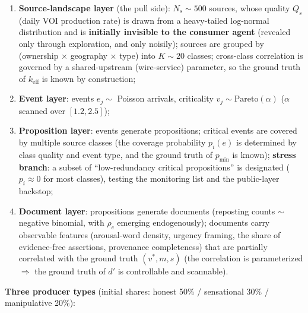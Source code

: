 \documentclass[
  11pt]{article}
\providecommand{\tightlist}{%
  \setlength{\itemsep}{0pt}\setlength{\parskip}{0pt}}
\begin{document}
\begin{enumerate}
\def\labelenumi{\arabic{enumi}.}
\tightlist
\item
  \textbf{Source-landscape layer} (the pull side): \(N_s \sim 500\)
  sources, whose quality \(Q_s\) (daily VOI production rate) is drawn
  from a heavy-tailed log-normal distribution and is \textbf{initially
  invisible to the consumer agent} (revealed only through exploration,
  and only noisily); sources are grouped by (ownership × geography ×
  type) into \(K \sim 20\) classes; cross-class correlation is governed
  by a shared-upstream (wire-service) parameter, so the ground truth of
  \(k_{\mathrm{eff}}\) is known by construction;
\item
  \textbf{Event layer}: events \(e_j \sim\) Poisson arrivals,
  criticality \(v_j \sim \mathrm{Pareto}(\alpha)\) (\(\alpha\) scanned
  over \([1.2, 2.5]\));
\item
  \textbf{Proposition layer}: events generate propositions; critical
  events are covered by multiple source classes (the coverage
  probability \(p_i(e)\) is determined by class quality and event type,
  and the ground truth of \(p_{\min}\) is known); \textbf{stress
  branch}: a subset of ``low-redundancy critical propositions'' is
  designated (\(p_i \approx 0\) for most classes), testing the
  monitoring list and the public-layer backstop;
\item
  \textbf{Document layer}: propositions generate documents (reposting
  counts \(\sim\) negative binomial, with \(\rho_c\) emerging
  endogenously); documents carry observable features (arousal-word
  density, urgency framing, the share of evidence-free assertions,
  provenance completeness) that are partially correlated with the ground
  truth \((v^*, m, s)\) (the correlation is parameterized
  \(\Rightarrow\) the ground truth of \(d'\) is controllable and
  scannable).
\end{enumerate}

\textbf{Three producer types} (initial shares: honest 50\% / sensational
30\% / manipulative 20\%):
\end{document}
